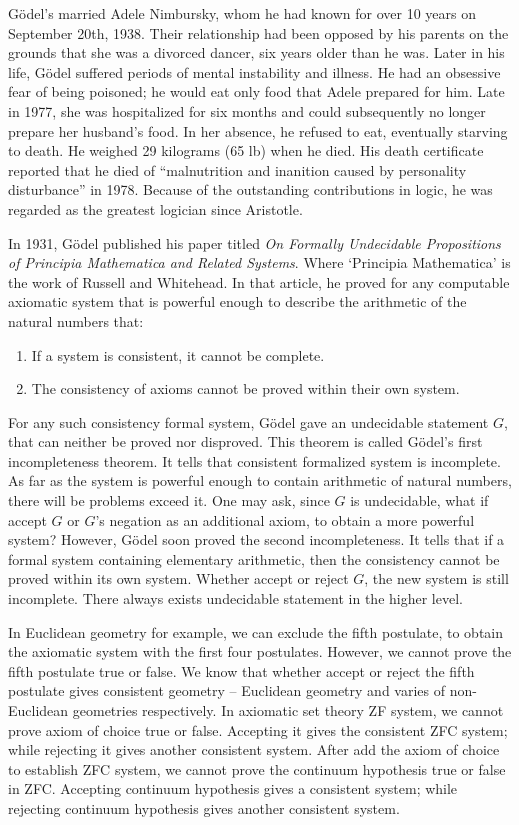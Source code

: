 \documentclass{article}
\begin{document}
Gödel's married Adele Nimbursky, whom he had known for over 10 years on September 20th, 1938. Their relationship had been opposed by his parents on the grounds that she was a divorced dancer, six years older than he was. Later in his life, Gödel suffered periods of mental instability and illness. He had an obsessive fear of being poisoned; he would eat only food that Adele prepared for him. Late in 1977, she was hospitalized for six months and could subsequently no longer prepare her husband's food. In her absence, he refused to eat, eventually starving to death. He weighed 29 kilograms (65 lb) when he died. His death certificate reported that he died of ``malnutrition and inanition caused by personality disturbance'' in 1978. Because of the outstanding contributions in logic, he was regarded as the greatest logician since Aristotle.

In 1931, Gödel published his paper titled {\em On Formally Undecidable Propositions of Principia Mathematica and Related Systems}. Where `Principia Mathematica' is the work of Russell and Whitehead. In that article, he proved for any computable axiomatic system that is powerful enough to describe the arithmetic of the natural numbers that:

\begin{enumerate}
\item If a system is consistent, it cannot be complete.
\item The consistency of axioms cannot be proved within their own system.
\end{enumerate}

For any such consistency formal system, Gödel gave an undecidable statement $G$, that can neither be proved nor disproved. This theorem is called Gödel's first incompleteness theorem. It tells that consistent formalized system is incomplete. As far as the system is powerful enough to contain arithmetic of natural numbers, there will be problems exceed it. One may ask, since $G$ is undecidable, what if accept $G$ or $G$'s negation as an additional axiom, to obtain a more powerful system? However, Gödel soon proved the second incompleteness. It tells that if a formal system containing elementary arithmetic, then the consistency cannot be proved within its own system. Whether accept or reject $G$, the new system is still incomplete. There always exists undecidable statement in the higher level.

In Euclidean geometry for example, we can exclude the fifth postulate, to obtain the axiomatic system with the first four postulates. However, we cannot prove the fifth postulate true or false. We know that whether accept or reject the fifth postulate gives consistent geometry -- Euclidean geometry and varies of non-Euclidean geometries respectively. In axiomatic set theory ZF system, we cannot prove axiom of choice true or false. Accepting it gives the consistent ZFC system; while rejecting it gives another consistent system. After add the axiom of choice to establish ZFC system, we cannot prove the continuum hypothesis true or false in ZFC. Accepting continuum hypothesis gives a consistent system; while rejecting continuum hypothesis gives another consistent system.
\end{document}
